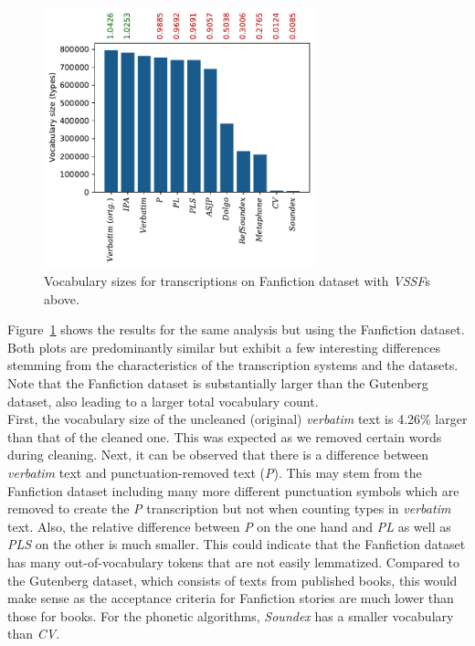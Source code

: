 \begin{figure}
  \centering
  \includegraphics[width=0.7\textwidth]{figures/vocab_sizes_2021-07-27_16-57-38_ff_pt}
  \caption{Vocabulary sizes for transcriptions on Fanfiction dataset with \textit{VSSF}s above.}
  \label{fig:vssf_transcriptions_ff}
\end{figure}
Figure~\ref{fig:vssf_transcriptions_ff} shows the results for the same analysis but using the Fanfiction dataset.
Both plots are predominantly similar but exhibit a few interesting differences stemming from the characteristics of the transcription systems and the datasets.
Note that the Fanfiction dataset is substantially larger than the Gutenberg dataset, also leading to a larger total vocabulary count.\\
First, the vocabulary size of the uncleaned (original) \textit{verbatim} text is 4.26\% larger than that of the cleaned one.
This was expected as we removed certain words during cleaning.
Next, it can be observed that there is a difference between \textit{verbatim} text and punctuation-removed text (\textit{P}).
This may stem from the Fanfiction dataset including many more different punctuation symbols which are removed to create the \textit{P} transcription but not when counting types in \textit{verbatim} text.
Also, the relative difference between \textit{P} on the one hand and \textit{PL} as well as \textit{PLS} on the other is much smaller.
This could indicate that the Fanfiction dataset has many out-of-vocabulary tokens that are not easily lemmatized.
Compared to the Gutenberg dataset, which consists of texts from published books, this would make sense as the acceptance criteria for Fanfiction stories are much lower than those for books.
For the phonetic algorithms, \textit{Soundex} has a smaller vocabulary than \textit{CV}.
